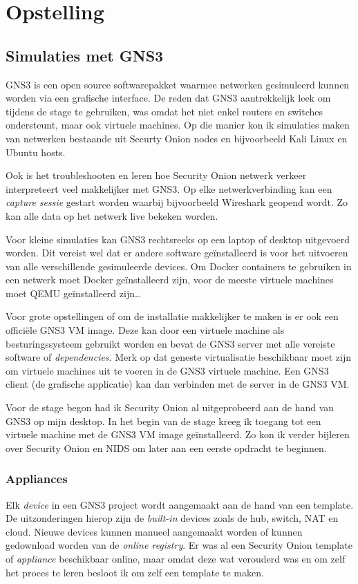 \documentclass[a4paper, 12pt]{report}
\begin{document}
\chapter{Opstelling}
\section{Simulaties met GNS3}
GNS3 is een open source softwarepakket waarmee netwerken gesimuleerd kunnen worden via een grafische interface.
De reden dat GNS3 aantrekkelijk leek om tijdens de stage te gebruiken, was omdat het niet enkel routers en switches ondersteunt, maar ook virtuele machines.
Op die manier kon ik simulaties maken van netwerken bestaande uit Securty Onion nodes en bijvoorbeeld Kali Linux en Ubuntu hosts.

Ook is het troubleshooten en leren hoe Security Onion netwerk verkeer interpreteert veel makkelijker met GNS3.
Op elke netwerkverbinding kan een \emph{capture sessie} gestart worden waarbij bijvoorbeeld Wireshark geopend wordt.
Zo kan alle data op het netwerk live bekeken worden.

Voor kleine simulaties kan GNS3 rechtsreeks op een laptop of desktop uitgevoerd worden.
Dit vereist wel dat er andere software geïnstalleerd is voor het uitvoeren van alle verschillende gesimuleerde devices. 
Om Docker containers te gebruiken in een netwerk moet Docker geïnstalleerd zijn, voor de meeste virtuele machines moet QEMU geïnstalleerd zijn\dots \autocite{gns3:home}

Voor grote opstellingen of om de installatie makkelijker te maken is er ook een officiële GNS3 VM image.
Deze kan door een virtuele machine als besturingssysteem gebruikt worden en bevat de GNS3 server met alle vereiste software of \emph{dependencies}.
Merk op dat geneste virtualisatie beschikbaar moet zijn om virtuele machines uit te voeren in de GNS3 virtuele machine.
Een GNS3 client (de grafische applicatie) kan dan verbinden met de server in de GNS3 VM.

Voor de stage begon had ik Security Onion al uitgeprobeerd aan de hand van GNS3 op mijn desktop.
In het begin van de stage kreeg ik toegang tot een virtuele machine met de GNS3 VM image geïnstalleerd.
Zo kon ik verder bijleren over Security Onion en NIDS om later aan een eerste opdracht te beginnen.

\subsection{Appliances}
Elk \emph{device} in een GNS3 project wordt aangemaakt aan de hand van een template.
De uitzonderingen hierop zijn de \emph{built-in} devices zoals de hub, switch, NAT en cloud.
Nieuwe devices kunnen manueel aangemaakt worden of kunnen gedownload worden van de \emph{online registry}.
Er was al een Security Onion template of \emph{appliance} beschikbaar online, maar omdat deze wat verouderd was en om zelf het proces te leren besloot ik om zelf een template te maken.
\end{document}
